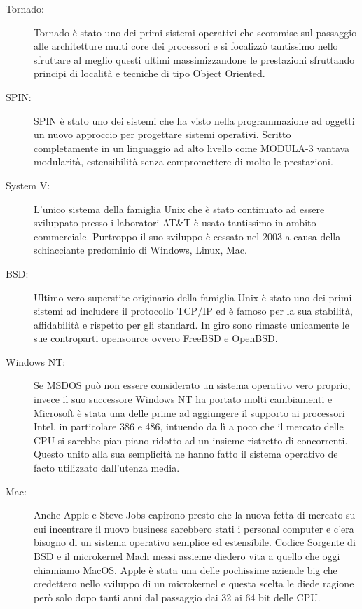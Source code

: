 \begin{description}
  \item[Tornado:] Tornado è stato uno dei primi sistemi operativi che scommise sul passaggio alle architetture multi core dei processori e si focalizzò tantissimo nello sfruttare al meglio questi ultimi massimizzandone le prestazioni sfruttando principi di località e tecniche di tipo Object Oriented.\cite{gamsa98}
  \item[SPIN:] SPIN è stato uno dei sistemi che ha visto nella programmazione ad oggetti un nuovo approccio per progettare sistemi operativi. Scritto completamente in un linguaggio ad alto livello come MODULA-3 vantava modularità, estensibilità senza compromettere di molto le prestazioni.\cite{bershad95}
  \item[System V:] L'unico sistema della famiglia Unix che è stato continuato ad essere sviluppato presso i laboratori AT\&T è usato tantissimo in ambito commerciale. Purtroppo il suo sviluppo è cessato nel 2003 a causa della schiacciante predominio di Windows, Linux, Mac.
  \item[BSD:] Ultimo vero superstite originario della famiglia Unix è stato uno dei primi sistemi ad includere il protocollo TCP/IP ed è famoso per la sua stabilità, affidabilità e rispetto per gli standard. In giro sono rimaste unicamente le sue controparti opensource ovvero FreeBSD e OpenBSD.
  \item[Windows NT:] Se MSDOS può non essere considerato un sistema operativo vero proprio, invece il suo successore Windows NT ha portato molti cambiamenti e Microsoft è stata una delle prime ad aggiungere il supporto ai processori Intel, in particolare 386 e 486, intuendo da lì a poco che il mercato delle CPU si sarebbe pian piano ridotto ad un insieme ristretto di concorrenti. Questo unito alla sua semplicità ne hanno fatto il sistema operativo de facto utilizzato dall'utenza media.
  \item[Mac:] Anche Apple e Steve Jobs capirono presto che la nuova fetta di mercato su cui incentrare il nuovo business sarebbero stati i personal computer e c'era bisogno di un sistema operativo semplice ed estensibile. Codice Sorgente di BSD e il microkernel Mach messi assieme diedero vita a quello che oggi chiamiamo MacOS. Apple è stata una delle pochissime aziende big che credettero nello sviluppo di un microkernel e questa scelta le diede ragione però solo dopo tanti anni dal passaggio dai 32 ai 64 bit delle CPU.

\end{description}
